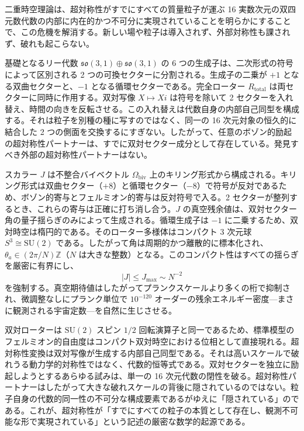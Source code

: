 \documentclass[a4paper]{article}
\begin{document}
二重時空理論は、超対称性がすでにすべての質量粒子が運ぶ 16 実数次元の双四元数代数の内部に内在的かつ不可分に実現されていることを明らかにすることで、この危機を解消する。新しい場や粒子は導入されず、外部対称性も課されず、破れも起こらない。

基礎となるリー代数 \(\mathfrak{so}(3,1) \oplus \mathfrak{so}(3,1)\) の 6 つの生成子は、二次形式の符号によって区別される 2 つの可換セクターに分割される。生成子の二乗が \(+1\) となる双曲セクターと、\(-1\) となる循環セクターである。完全ローター \(R_\text{total}\) は両セクターに同時に作用する。双対写像 \(X \mapsto Xi\) は符号を除いて 2 セクターを入れ替え、時間の向きを反転させる。この入れ替えは代数自身の内部自己同型を構成する。それは粒子を別種の種に写すのではなく、同一の 16 次元対象の恒久的に結合した 2 つの側面を交換するにすぎない。したがって、任意のボゾン的励起の超対称性パートナーは、すでに双対セクター成分として存在している。発見すべき外部の超対称性パートナーはない。

スカラー \(J\) は不整合バイベクトル \(\Omega_\text{biv}\) 上のキリング形式から構成される。キリング形式は双曲セクター（\(+8\)）と循環セクター（\(-8\)）で符号が反対であるため、ボゾン的寄与とフェルミオン的寄与は反対符号で入る。2 セクターが整列するとき、これらの寄与は正確に打ち消し合う。\(J\) の真空残余値は、双対セクター角の量子揺らぎのみによって生成される。循環生成子は \(-1\) に二乗するため、双対時空は楕円的である。そのローター多様体はコンパクト 3 次元球 \(S^3 \cong \mathrm{SU}(2)\) である。したがって角は周期的かつ離散的に標本化され、\(\theta_a \in (2\pi/N)\mathbb{Z}\)（\(N\) は大きな整数）となる。このコンパクト性はすべての揺らぎを厳密に有界にし、
\[
|J| \le J_\text{max} \sim N^{-2}
\]
を強制する。真空期待値はしたがってプランクスケールより多くの桁で抑制され、微調整なしにプランク単位で \(10^{-120}\) オーダーの残余エネルギー密度---まさに観測される宇宙定数---を自然に生じさせる。

双対ローターは \(\mathrm{SU}(2)\) スピン \(1/2\) 回転演算子と同一であるため、標準模型のフェルミオン的自由度はコンパクト双対時空における位相として直接現れる。超対称性変換は双対写像が生成する内部自己同型である。それは高いスケールで破れうる動力学的対称性ではなく、代数的恒等式である。双対セクターを独立に励起しようとするあらゆる試みは、単一の 16 次元代数の閉性を破る。超対称性パートナーはしたがって大きな破れスケールの背後に隠されているのではない。粒子自身の代数的同一性の不可分な構成要素であるがゆえに「隠されている」のである。これが、超対称性が「すでにすべての粒子の本質として存在し、観測不可能な形で実現されている」という記述の厳密な数学的起源である。
\end{document}
